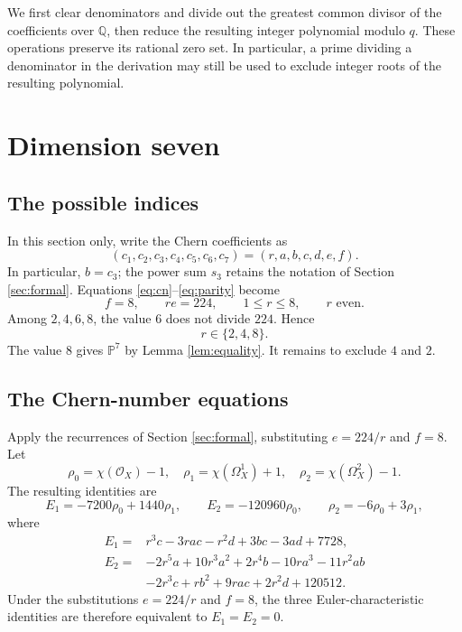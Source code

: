 \documentclass[11pt,reqno,letterpaper]{amsart}
\newcommand{\Q}{\mathbb Q}
\newcommand{\PP}{\mathbb P}
\newcommand{\OO}{\mathcal O}
\theoremstyle{definition}
\numberwithin{equation}{section}
\begin{document}
We first clear denominators and divide out the greatest common divisor
of the coefficients over $\Q$, then reduce the resulting integer
polynomial modulo $q$. These operations preserve its rational zero set.
In particular, a prime dividing a denominator in the derivation may
still be used to exclude integer roots of the resulting polynomial.

\section{Dimension seven}\label{sec:C7}

\subsection{The possible indices}
In this section only, write the Chern coefficients as
\[
 (c_1,c_2,c_3,c_4,c_5,c_6,c_7)=(r,a,b,c,d,e,f).
\]
In particular, $b=c_3$; the power sum $s_3$ retains the notation of
Section \ref{sec:formal}.
Equations \eqref{eq:cn}--\eqref{eq:parity} become
\[
 f=8,\qquad re=224,\qquad 1\le r\le8,\qquad r\text{ even}.
\]
Among $2,4,6,8$, the value $6$ does not divide $224$. Hence
\begin{equation}\label{eq:C7indices}
 r\in\{2,4,8\}.
\end{equation}
The value $8$ gives $\PP^7$ by Lemma \ref{lem:equality}.
It remains to exclude $4$ and $2$.

\subsection{The Chern-number equations}
Apply the recurrences of Section \ref{sec:formal}, substituting $e=224/r$
and $f=8$. Let
\[
 \rho_0=\chi(\OO_X)-1,\quad
 \rho_1=\chi(\Omega_X^1)+1,\quad
 \rho_2=\chi(\Omega_X^2)-1.
\]
The resulting identities are
\[
 E_1=-7200\rho_0+1440\rho_1,\qquad
 E_2=-120960\rho_0,\qquad
 \rho_2=-6\rho_0+3\rho_1,
\]
where
\begin{align}
 E_1={}&r^3c-3rac-r^2d+3bc-3ad+7728,\label{eq:C7E1}\\
 E_2={}&-2r^5a+10r^3a^2+2r^4b-10ra^3-11r^2ab\nonumber\\
       &-2r^3c+rb^2+9rac+2r^2d+120512.\label{eq:C7E2}
\end{align}
Under the substitutions $e=224/r$ and $f=8$, the three
Euler-characteristic identities are therefore equivalent to
$E_1=E_2=0$.
\end{document}
